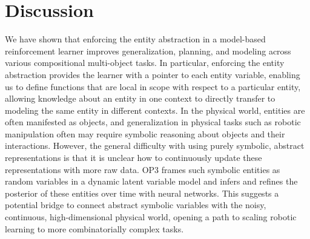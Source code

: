 \section{Discussion}
We have shown that enforcing the entity abstraction in a model-based reinforcement learner improves generalization, planning, and modeling across various compositional multi-object tasks.
In particular, enforcing the entity abstraction provides the learner with a pointer to each entity variable, enabling us to define functions that are local in scope with respect to a particular entity, allowing knowledge about an entity in one context to directly transfer to modeling the same entity in different contexts.
In the physical world, entities are often manifested as objects, and generalization in physical tasks such as robotic manipulation often may require symbolic reasoning about objects and their interactions.
However, the general difficulty with using purely symbolic, abstract representations is that it is unclear how to continuously update these representations with more raw data.
OP3 frames such symbolic entities as random variables in a dynamic latent variable model and infers and refines the posterior of these entities over time with neural networks.
This suggests a potential bridge to connect abstract symbolic variables with the noisy, continuous, high-dimensional physical world, opening a path to scaling robotic learning to more combinatorially complex tasks.